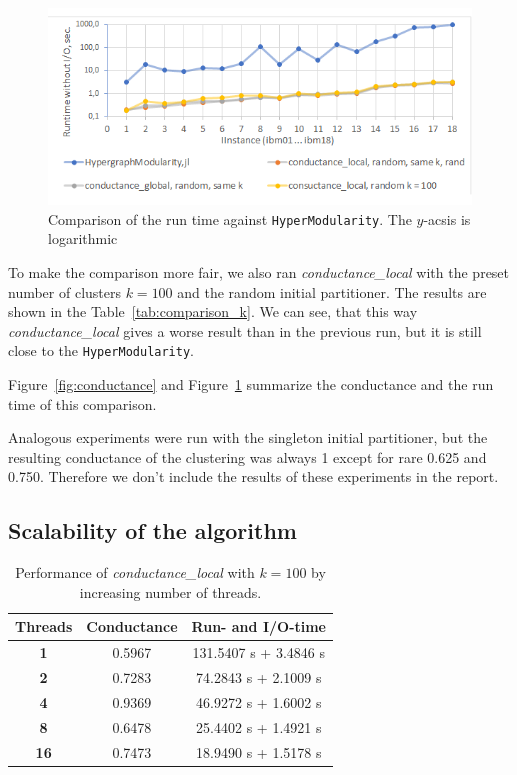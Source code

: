 \documentclass[acmsmall,nonacm,screen,review]{acmart}
\begin{document}
\begin{figure}[t]
    \centering 
    \includegraphics{time_comparison.png}
    \caption{Comparison of the run time against \texttt{HyperModularity}. The $y$-acsis is logarithmic}%
    \label{fig:time}
\end{figure}

To make the comparison more fair, we also ran \textit{conductance\_local} with the 
preset number of clusters $k = 100$ and the random initial partitioner. 
The results are shown in the Table~\ref{tab:comparison_k}. We can see, that
this way \textit{conductance\_local} gives a worse result than in the previous run,
but it is still close to the \texttt{HyperModularity}.

Figure~\ref{fig:conductance} and Figure~\ref{fig:time} summarize the conductance 
and the run time of this comparison. 

\medskip
Analogous experiments were run with the singleton initial partitioner, but the resulting
conductance of the clustering was always 1 except for rare 0.625 and 0.750. Therefore we 
don't include the results of these experiments in the report.

\subsection{Scalability of the algorithm}

\begin{table}
    \centering
    \begin{tabular}{|c|c|c|} \hline
        \textbf{Threads} & \textbf{Conductance} & \textbf{Run- and I/O-time} \\ \hline
        \textbf{1} & 0.5967 & 131.5407 s  + 3.4846 s \\ 
        \textbf{2} & 0.7283 & 74.2843 s + 2.1009 s \\ 
        \textbf{4} & 0.9369 & 46.9272 s  + 1.6002 s \\ 
        \textbf{8} & 0.6478 & 25.4402 s + 1.4921 s \\ 
        \textbf{16} & 0.7473 & 18.9490 s  + 1.5178 s \\ \hline
    \end{tabular}
    \caption{Performance of \textit{conductance\_local} with $k = 100$ 
    by increasing number of threads.}
    \label{tab:scalability_t}
\end{table}
\end{document}
